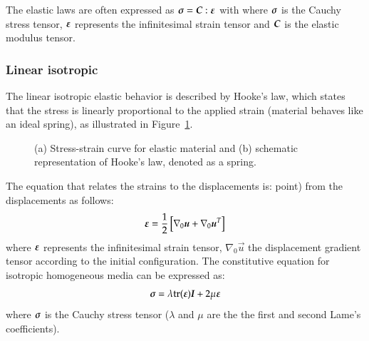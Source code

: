 The elastic laws are often expressed as $\boldsymbol{\sigma} =
\boldsymbol{C}:\boldsymbol{\varepsilon}$ with where $\boldsymbol{\sigma}$ is the Cauchy stress tensor,
$\boldsymbol{\varepsilon}$ represents the infinitesimal strain tensor and $\boldsymbol{C}$ is the
elastic modulus tensor.

\subsubsection{Linear isotropic}

The linear isotropic elastic behavior is described by Hooke's law, which states
that the stress is linearly proportional to the applied strain (material behaves
like an ideal spring), as illustrated in Figure~\ref{fig:smm:cl:elastic}.
\begin{figure}[!htb]
  \begin{center}

    \hspace{0.05\textwidth} 
    \caption{(a) Stress-strain curve for elastic material and (b)
      schematic representation of Hooke's law, denoted as a spring.}
    \label{fig:smm:cl:elastic}
  \end{center}
\end{figure}
The equation that relates the strains to the
displacements is: %
point) from the displacements as follows:
\begin{equation}
  \label{eqn:smm:strain_inf}
  \boldsymbol{\varepsilon} =
  \frac{1}{2} \left[ \nabla_0 \boldsymbol{u}+\nabla_0 \boldsymbol{u}^T \right]
\end{equation}
where $\boldsymbol{\varepsilon}$ represents the infinitesimal strain tensor,
$\nabla_{0}\vec{u}$ the displacement gradient
tensor according to the initial configuration. The constitutive equation
for isotropic homogeneous media can be expressed as:
\begin{equation}
  \label{eqn:smm:material:constitutive_elastic}
  \boldsymbol{\sigma } =\lambda\mathrm{tr}(\boldsymbol{\varepsilon})\boldsymbol{I}+2 \mu\boldsymbol{\varepsilon}
\end{equation}
where $\boldsymbol{\sigma}$ is the Cauchy stress tensor
($\lambda$ and $\mu$ are the the first and second Lame's
coefficients).

